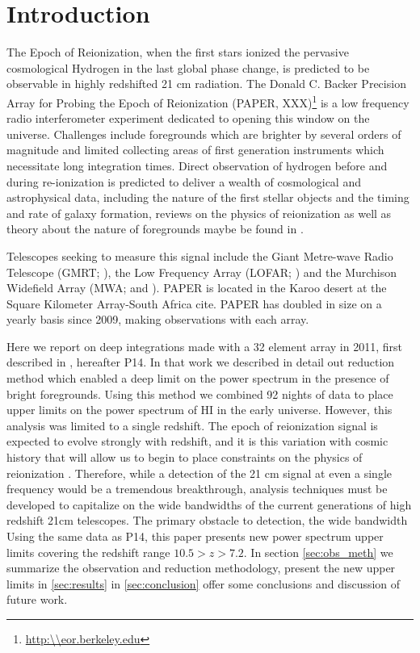 \documentclass[preprint]{aastex}
\begin{document}
\section{Introduction}
The Epoch of Reionization, when the first stars ionized the pervasive cosmological Hydrogen in the last global phase change, is predicted to be observable in highly redshifted 21 cm radiation.  The Donald C. Backer Precision Array for Probing the Epoch of Reionization (PAPER, XXX)\footnote{\url{http:\\eor.berkeley.edu}} is a low frequency radio interferometer experiment dedicated to opening this window on the universe.  Challenges include foregrounds which are brighter by several orders of magnitude and limited collecting areas of first generation instruments which necessitate long integration times. Direct observation of hydrogen before and during re-ionization is predicted to deliver a wealth of cosmological and astrophysical data, including the nature of the first stellar objects and the timing and rate of galaxy formation, reviews on the physics of reionization as well as theory about the nature of foregrounds maybe be found in \citet{Furlanetto:2006p2267,Morales:2010p8093,Pritchard:2012p9555}.

Telescopes seeking to measure this signal include the Giant Metre-wave Radio Telescope (GMRT; \cite{Paciga:2013p9943}), the Low Frequency Array (LOFAR; \cite{Yatawatta:2013p9699}) and the Murchison Widefield Array (MWA; \cite{Bowman:2013p9950} and \cite{Tingay:2013p9022}). PAPER is located in the Karoo desert at the Square Kilometer Array-South Africa cite. PAPER has doubled in size on a yearly basis since 2009, making observations with each array.  


Here we report on deep integrations made with a 32 element array in 2011, first described in \cite{Parsons:2013p9876}, hereafter P14.  In that work we described in detail out reduction method which enabled a deep limit on the power spectrum in the presence of bright foregrounds. Using this method we combined 92 nights of data to place upper limits on the power spectrum of HI in the early universe.  However, this analysis was limited to a single redshift.  The epoch of reionization signal is expected to evolve strongly with redshift, and it is this variation with cosmic history that will allow us to begin to place constraints on the physics of reionization \cite{Pritchard:2008p8123,Pober:2014p10390}.  Therefore, while a detection of the 21 cm signal at even a single frequency would be a tremendous breakthrough, analysis techniques must be developed to capitalize on the wide bandwidths of the current generations of high redshift 21cm telescopes.  The primary obstacle to detection, the wide bandwidth Using the same data as P14, this paper presents new power spectrum upper limits covering the redshift range $10.5>z>7.2$.  In section  \ref{sec:obs_meth} we summarize the observation and reduction methodology, present the new upper limits in \ref{sec:results} in \ref{sec:conclusion} offer some conclusions and discussion of future work.
\end{document}

